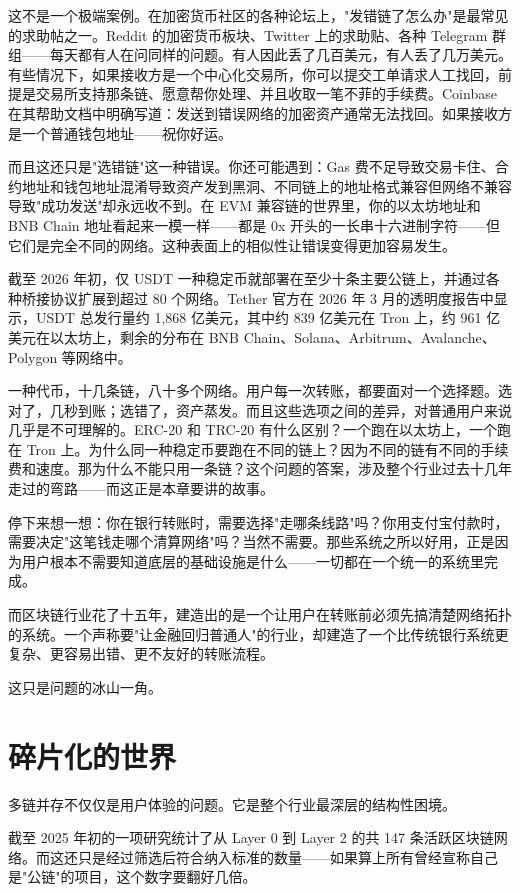 \documentclass[a4paper,12pt,openany]{ctexbook}
\begin{document}
这不是一个极端案例。在加密货币社区的各种论坛上，"发错链了怎么办"是最常见的求助帖之一。Reddit 的加密货币板块、Twitter 上的求助贴、各种 Telegram 群组——每天都有人在问同样的问题。有人因此丢了几百美元，有人丢了几万美元。有些情况下，如果接收方是一个中心化交易所，你可以提交工单请求人工找回，前提是交易所支持那条链、愿意帮你处理、并且收取一笔不菲的手续费。Coinbase 在其帮助文档中明确写道：发送到错误网络的加密资产通常无法找回。如果接收方是一个普通钱包地址——祝你好运。

而且这还只是"选错链"这一种错误。你还可能遇到：Gas 费不足导致交易卡住、合约地址和钱包地址混淆导致资产发到黑洞、不同链上的地址格式兼容但网络不兼容导致"成功发送"却永远收不到。在 EVM 兼容链的世界里，你的以太坊地址和 BNB Chain 地址看起来一模一样——都是 0x 开头的一长串十六进制字符——但它们是完全不同的网络。这种表面上的相似性让错误变得更加容易发生。

截至 2026 年初，仅 USDT 一种稳定币就部署在至少十条主要公链上，并通过各种桥接协议扩展到超过 80 个网络。Tether 官方在 2026 年 3 月的透明度报告中显示，USDT 总发行量约 1,868 亿美元，其中约 839 亿美元在 Tron 上，约 961 亿美元在以太坊上，剩余的分布在 BNB Chain、Solana、Arbitrum、Avalanche、Polygon 等网络中。

一种代币，十几条链，八十多个网络。用户每一次转账，都要面对一个选择题。选对了，几秒到账；选错了，资产蒸发。而且这些选项之间的差异，对普通用户来说几乎是不可理解的。ERC-20 和 TRC-20 有什么区别？一个跑在以太坊上，一个跑在 Tron 上。为什么同一种稳定币要跑在不同的链上？因为不同的链有不同的手续费和速度。那为什么不能只用一条链？这个问题的答案，涉及整个行业过去十几年走过的弯路——而这正是本章要讲的故事。

停下来想一想：你在银行转账时，需要选择"走哪条线路"吗？你用支付宝付款时，需要决定"这笔钱走哪个清算网络"吗？当然不需要。那些系统之所以好用，正是因为用户根本不需要知道底层的基础设施是什么——一切都在一个统一的系统里完成。

而区块链行业花了十五年，建造出的是一个让用户在转账前必须先搞清楚网络拓扑的系统。一个声称要"让金融回归普通人"的行业，却建造了一个比传统银行系统更复杂、更容易出错、更不友好的转账流程。

这只是问题的冰山一角。


\section*{碎片化的世界}


多链并存不仅仅是用户体验的问题。它是整个行业最深层的结构性困境。

截至 2025 年初的一项研究统计了从 Layer 0 到 Layer 2 的共 147 条活跃区块链网络。而这还只是经过筛选后符合纳入标准的数量——如果算上所有曾经宣称自己是"公链"的项目，这个数字要翻好几倍。
\end{document}
